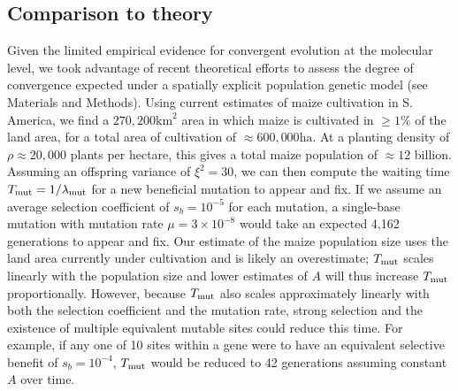 \subsection*{Comparison to theory}


Given the limited empirical evidence for convergent evolution at the molecular level, we took advantage of recent theoretical efforts \cite[]{ralph2014convergent} to assess the degree of convergence expected under a spatially explicit population genetic model (see Materials and Methods).
Using current estimates of maize cultivation in S. America, we find a $270,200\text{km}^2$ area in which maize is cultivated in $\ge 1\%$ of the land area, for a total area of cultivation of $\approx 600,000 \text{ha}$.  
At a planting density of $\rho \approx 20,000$ plants per hectare, this gives a total maize population of $\approx 12$ billion. 
Assuming an offspring variance of $\xi^2 = 30$, we can then compute the waiting time $T_{\text{mut}}=1/\lambda_{\text{mut}}$ for a new beneficial mutation to appear and fix.
If we assume an average selection coefficient of $s_b=10^{-5}$ for each mutation, a single-base mutation with mutation rate $\mu=3\times 10^{-8}$ \citep{Clark_2005_16079248} would take an expected 4,162 generations to appear and fix.
Our estimate of the maize population size uses the land area currently under cultivation and is likely an overestimate; $T_{\text{mut}}$ scales linearly with the population size and lower estimates of $A$ will thus increase $T_{\text{mut}}$ proportionally.
However, because $T_{\text{mut}}$ also scales approximately linearly with both the selection coefficient and the mutation rate, strong selection and the existence of multiple equivalent mutable sites could reduce this time. 
For example, if any one of 10 sites within a gene were to have an equivalent selective benefit of $s_b=10^{-4}$, $T_{\text{mut}}$ would be reduced to 42 generations assuming constant $A$ over time. 


